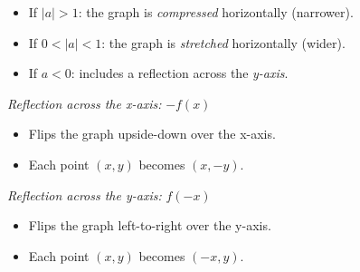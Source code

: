 \begin{itemize}

	\item If \( |a| > 1 \): the graph is \emph{compressed} horizontally (narrower).

	\item If \( 0 < |a| < 1 \): the graph is \emph{stretched} horizontally (wider).

	\item If \( a < 0 \): includes a reflection across the \emph{y-axis}.

\end{itemize}

\emph{Reflection across the x-axis:} \( -f(x) \)
	
\begin{itemize}

	\item Flips the graph upside-down over the x-axis.

	\item Each point \( (x, y) \) becomes \( (x, -y) \).

\end{itemize}

\emph{Reflection across the y-axis:} \( f(-x) \)

\begin{itemize}

	\item Flips the graph left-to-right over the y-axis.

	\item Each point \( (x, y) \) becomes \( (-x, y) \).

\end{itemize}


